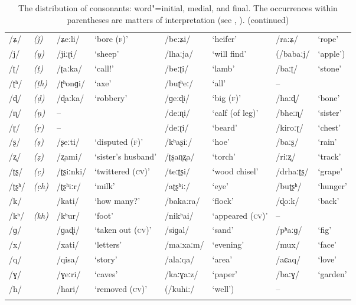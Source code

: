 \addtocounter{table}{-1}
\begin{sidewaystable}[p!]
\caption{The distribution of consonants: word"=initial, medial, and final. The
  occurrences within parentheses are matters of interpretation (see , ). (continued)}
\begin{tabularx}{\textwidth}{ l@{\hspace{20pt}} l@{\hspace{20pt}} Q l@{\hspace{20pt}} Q Q Q Q }
\lsptoprule
/ʑ/ &
\textit{(ǰ)} &
/ʑeːli/ &
`bore (\textsc{f)}' &
/beːʑi/ &
`heifer' &
/raːʑ/ &
`rope'\\
/j/ &
\textit{(y)} &
/jiːɽi/ &
`sheep' &
/lhaːja/ &
`will find' &
(/babaːj/ &
`apple')\\
/ʈ/ &
\textit{(ṭ)} &
/ʈaːka/ &
`call!' &
/beːʈi/ &
`lamb' &
/baːʈ/ &
`stone'\\
/ʈʰ/ &
\textit{(ṭh)} &
/ʈʰonɡi/ &
`axe' &
/buʈʰeː/ &
`all' &
-- &
\\
/ɖ/ &
\textit{(ḍ)} &
/ɖaːka/ &
`robbery' &
/ɡeːɖi/ &
`big (\textsc{f)}' &
/haːɖ/ &
`bone'\\
/ɳ/ &
\textit{(ṇ)} &
-- &
&
/deːɳi/ &
`calf (of leg)' &
/bheːɳ/ &
`sister'\\
/ɽ/ &
\textit{(ṛ)} &
-- &
&
/deːɽi/ &
`beard' &
/kiroːɽ/ &
`chest'\\
/ʂ/ &
\textit{(ṣ)} &
/ʂeːti/ &
`disputed (\textsc{f)}' &
/kʰaʂiː/ &
`hoe' &
/baːʂ/ &
`rain'\\
/ʐ/ &
\textit{(ẓ)} &
/ʐami/ &
`sister's husband' &
/ʈʂaɳʐa/ &
`torch' &
/riːʐ/ &
`track'\\
/ʈʂ/ &
\textit{(c̣)} &
/ʈʂiːnki/ &
`twittered (\textsc{cv)}' &
/teːʈʂi/ &
`wood chisel' &
/drhaːʈʂ/ &
`grape'\\
/ʈʂʰ/ &
\textit{(c̣h)} &
/ʈʂʰiːr/ &
`milk' &
/aʈʂʰiː/ &
`eye' &
/buʈʂʰ/ &
`hunger'\\
/k/ &
&
/kati/ &
`how many?' &
/bakaːra/ &
`flock' &
/ɖoːk/ &
`back'\\
/kʰ/ &
\textit{(kh)} &
/kʰur/ &
`foot' &
/nikʰai/ &
`appeared (\textsc{cv)}'  &
-- &
\\
/ɡ/ &
&
/ɡaɖi/ &
`taken out (\textsc{cv)}' &
/siɡal/ &
`sand' &
/pʰaːɡ/ &
`fig'\\
/x/ &
&
/xati/ &
`letters' &
/maːxaːm/ &
`evening' &
/mux/ &
`face'\\
/q/ &
&
/qisa/ &
`story' &
/alaːqa/ &
`area' &
/aɕaq/ &
`love'\\
/ɣ/ &
&
/ɣeːri/ &
`caves' &
/kaːɣaːz/ &
`paper' &
/baːɣ/ &
`garden'\\
/h/ &
&
/hari/ &
`removed \textsc{(cv)}' &
(/kuhiː/ &
`well') &
-- &
\\\lspbottomrule
\end{tabularx}
\label{tab:3-2}
\end{sidewaystable}

